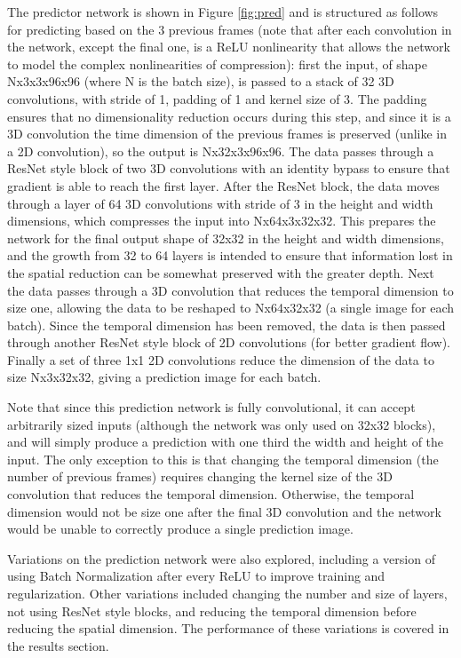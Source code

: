 \documentclass[10pt,twocolumn,letterpaper]{article}
\begin{document}
The predictor network is shown in Figure \ref{fig:pred} and is structured as follows for predicting based on the $3$ previous frames (note that after each convolution in the network, except the final one, is a ReLU nonlinearity that allows the network to model the complex nonlinearities of compression): first the input, of shape Nx3x3x96x96 (where N is the batch size), is passed to a stack of 32 3D convolutions, with stride of 1, padding of 1 and kernel size of 3. The padding ensures that no dimensionality reduction occurs during this step, and since it is a 3D convolution the time dimension of the previous frames is preserved (unlike in a 2D convolution), so the output is Nx32x3x96x96. The data passes through a ResNet \cite{DBLP:journals/corr/HeZRS15} style block of two 3D convolutions with an identity bypass to ensure that gradient is able to reach the first layer. After the ResNet block, the data moves through a layer of 64 3D convolutions with stride of 3 in the height and width dimensions, which compresses the input into Nx64x3x32x32. This prepares the network for the final output shape of 32x32 in the height and width dimensions, and the growth from 32 to 64 layers is intended to ensure that information lost in the spatial reduction can be somewhat preserved with the greater depth. Next the data passes through a 3D convolution that reduces the temporal dimension to size one, allowing the data to be reshaped to Nx64x32x32 (a single image for each batch). Since the temporal dimension has been removed, the data is then passed through another ResNet style block of 2D convolutions (for better gradient flow). Finally a set of three 1x1 2D convolutions reduce the dimension of the data to size Nx3x32x32, giving a prediction image for each batch. 

  Note that since this prediction network is fully convolutional, it can accept arbitrarily sized inputs (although the network was only used on 32x32 blocks), and will simply produce a prediction with one third the width and height of the input. The only exception to this is that changing the temporal dimension (the number of previous frames) requires changing the kernel size of the 3D convolution that reduces the temporal dimension. Otherwise, the temporal dimension would not be size one after the final 3D convolution and the network would be unable to correctly produce a single prediction image. 
  
  Variations on the prediction network were also explored, including a version of using Batch Normalization \cite{DBLP:journals/corr/IoffeS15} after every ReLU to improve training and regularization. Other variations included changing the number and size of layers, not using ResNet style blocks, and reducing the temporal dimension before reducing the spatial dimension. The performance of these variations is covered in the results section.
\end{document}
